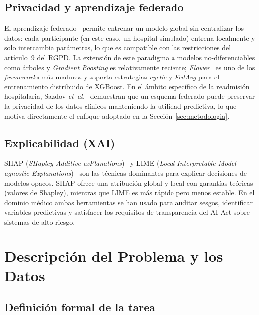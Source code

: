 \documentclass[11pt,a4paper]{article}
\begin{document}
\subsection{Privacidad y aprendizaje federado}

El aprendizaje federado~\cite{ref_mcmahan} permite entrenar un modelo global sin centralizar los datos: cada participante (en este caso, un hospital simulado) entrena localmente y solo intercambia parámetros, lo que es compatible con las restricciones del artículo~9 del RGPD. La extensión de este paradigma a modelos no-diferenciables como árboles y \textit{Gradient Boosting} es relativamente reciente; \textit{Flower}~\cite{ref_flower} es uno de los \textit{frameworks} más maduros y soporta estrategias \textit{cyclic} y \textit{FedAvg} para el entrenamiento distribuido de XGBoost. En el ámbito específico de la readmisión hospitalaria, Sazdov \emph{et~al.}~\cite{ref_sazdov} demuestran que un esquema federado puede preservar la privacidad de los datos clínicos manteniendo la utilidad predictiva, lo que motiva directamente el enfoque adoptado en la Sección~\ref{sec:metodologia}.

\subsection{Explicabilidad (XAI)}

SHAP (\textit{SHapley Additive exPlanations})~\cite{ref_shap} y LIME (\textit{Local Interpretable Model-agnostic Explanations})~\cite{ref_lime} son las técnicas dominantes para explicar decisiones de modelos opacos. SHAP ofrece una atribución global y local con garantías teóricas (valores de Shapley), mientras que LIME es más rápido pero menos estable. En el dominio médico ambas herramientas se han usado para auditar sesgos, identificar variables predictivas y satisfacer los requisitos de transparencia del AI Act sobre sistemas de alto riesgo.


\section{Descripción del Problema y los Datos}
\label{sec:datos}

\subsection{Definición formal de la tarea}
\end{document}
